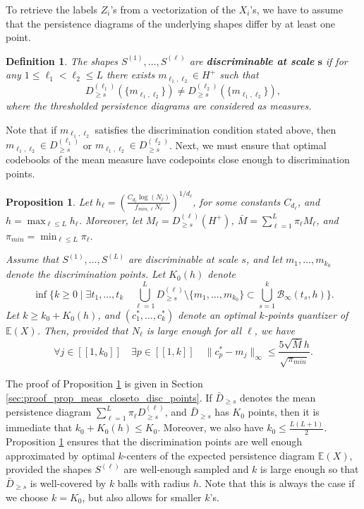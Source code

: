 \documentclass[noinfoline,preprint]{article}
\newtheorem{defi}[theorem]{Definition}
\newtheorem{prop}[theorem]{Proposition}
\newcommand{\E}{\mathbb{E}}
\renewcommand{\1}{\mathds 1}
\newcommand{\B}{\mathcal{B}}
\begin{document}
To retrieve the labels $Z_i$'s from a vectorization of the $X_i$'s, we have to assume that the persistence diagrams of the underlying shapes differ by at least one point.
\begin{defi}\label{def:separability_classes}
The shapes $S^{(1)}, \hdots, S^{(\ell)}$ are \textbf{discriminable at scale} $\mathbf{s}$ if for any $1 \leq \ell_1 < \ell_2 \leq L$ there exists $m_{\ell_1,\ell_2} \in H^+$ such that
\[
D^{(\ell_1)}_{\geq s}(\{m_{\ell_1,\ell_2}\}) \neq D^{(\ell_2)}_{\geq s}(\{m_{\ell_1,\ell_2}\}),
\]
where the thresholded persistence diagrams are considered as measures.
\end{defi}
Note that if $m_{\ell_1,\ell_2}$ satisfies the discrimination condition stated above, then $m_{\ell_1,\ell_2} \in D^{(\ell_1)}_{\geq s}$ or $m_{\ell_1,\ell_2} \in D^{(\ell_2)}_{\geq s}$. Next, we must ensure that optimal codebooks of the mean measure have codepoints close enough to discrimination points. 
\begin{prop}\label{prop:mean_meas_closeto_disc_points}
Let $h_\ell = \left ( \frac{C_{d_\ell} \log(N_\ell)}{f_{min,\ell} N_\ell} \right)^{1/d_\ell}$, for some constants $C_{d_\ell}$, and $h = \max_{\ell \leq L} h_\ell$. Moreover, let $M_\ell = D^{(\ell)}_{\geq s}(H^+)$, $\bar{M}= \sum_{\ell = 1}^L \pi_\ell M_\ell$, and $\pi_{min} = \min_{ \ell \leq L} \pi_\ell$. 

Assume that $S^{(1)}, \hdots, S^{(L)}$ are discriminable at scale $s$, and let $m_1, \hdots, m_{k_0}$ denote the discrimination points. Let $K_0(h)$ denote
\[
\inf\{ k \geq 0 \mid \exists t_1, \hdots, t_{k} \quad  \bigcup_{ \ell =1}^{L} D_{\geq s}^{(\ell)} \setminus \{m_1, \hdots, m_{k_0} \}  \subset \bigcup_{s=1}^{k} \B_{\infty}(t_s,h) \}.
\]
Let $k \geq k_0 + K_0(h)$, and $(c^*_1, \hdots, c^*_k)$ denote an optimal $k$-points quantizer  of $\E(X)$. Then, provided that $N_\ell$ is large enough for all $\ell$, we have
\[
\forall j \in [\![1,k_0]\!] \quad \exists p \in [\![1,k]\!] \quad \| c_p^* - m_j \|_\infty \leq \frac{5\sqrt{\bar{M}}h}{\sqrt{\pi_{min}}}.
\]
\end{prop}
The proof of Proposition \ref{prop:mean_meas_closeto_disc_points} is given in Section \ref{sec:proof_prop_meas_closeto_disc_points}. If $\bar{D}_{\geq s}$ denotes the mean persistence diagram $\sum_{\ell = 1}^{L} \pi_\ell D^{(\ell)}_{\geq s}$, and $\bar{D}_{\geq s}$ has $K_0$ points, then it is immediate that $k_0 + K_0(h) \leq K_0$. Moreover, we also have $k_0 \leq \frac{L(L+1)}{2}$. Proposition \ref{prop:mean_meas_closeto_disc_points} ensures that the discrimination points are well enough approximated by optimal $k$-centers of the expected persistence diagram $\E(X)$, provided the shapes $S^{(\ell)}$ are well-enough sampled and $k$ is large enough so that $\bar{D}_{\geq s}$ is well-covered by $k$ balls with radius $h$. Note that this is always the case if we choose $k=K_0$, but also allows for smaller $k$'s.
\end{document}
